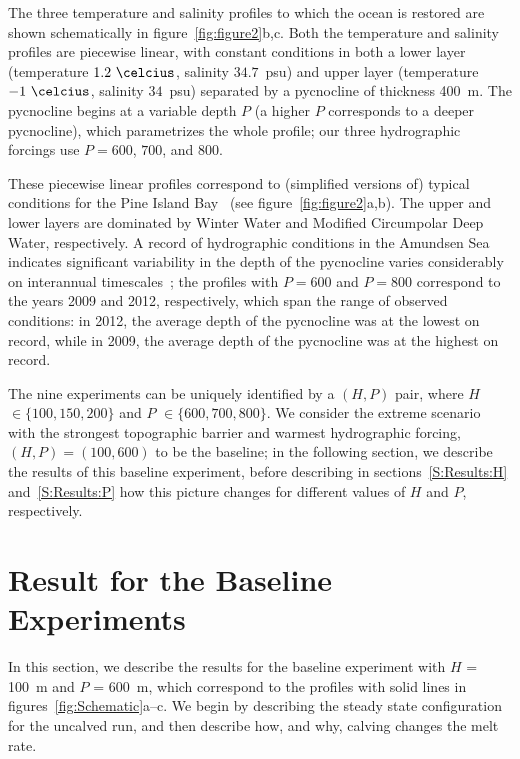 \documentclass[draft]{agujournal2019}
\begin{document}
The three temperature and salinity profiles to which the ocean is restored are shown schematically in figure~\ref{fig:figure2}b,c. Both the temperature and salinity profiles are piecewise linear, with constant conditions in both a lower layer (temperature $1.2~\si{\celcius}$, salinity $34.7$~psu) and upper layer (temperature $-1~\si{\celcius}$, salinity $34$~psu) separated by a pycnocline of thickness 400~m. The pycnocline begins at a variable depth $P$ (a higher $P$ corresponds to a deeper pycnocline), which parametrizes the whole profile; our three hydrographic forcings use $P = 600$, $700$, and $800$. 

These piecewise linear profiles correspond to (simplified versions of) typical conditions for the Pine Island Bay~\cite{Jacobs1996GRL, Dutrieux2014Science, Jenkins2018NatureGeo} (see figure~\ref{fig:figure2}a,b). The upper and lower layers are dominated by Winter Water and Modified Circumpolar Deep Water, respectively. A record of hydrographic conditions in the Amundsen Sea indicates significant variability in the depth of the pycnocline varies considerably on interannual timescales~\cite{Dutrieux2014Science}; the profiles with $P = 600$ and $P = 800$ correspond to the years 2009 and 2012, respectively, which span the range of observed conditions: in 2012, the average depth of the pycnocline was at the lowest on record, while in 2009, the average depth of the pycnocline was at the highest on record. 

The nine experiments can be uniquely identified by a $(H,P)$ pair, where $H$ $\in \{100, 150, 200\}$ and $P$ $\in \{600, 700, 800\}$. We consider the extreme scenario with the strongest topographic barrier and warmest hydrographic forcing, $(H,P) = (100,600)$ to be the baseline; in the following section, we describe the results of this baseline experiment, before describing in sections~\ref{S:Results:H} and~\ref{S:Results:P} how this picture changes for different values of $H$ and $P$, respectively.

\section{Result for the Baseline Experiments}\label{S:Baseline}
In this section, we describe the results for the baseline experiment with $H$ = 100~m and $P$ = 600~m, which correspond to the profiles with solid lines in figures~\ref{fig:Schematic}a--c. We begin by describing the steady state configuration for the uncalved run, and then describe how, and why, calving changes the melt rate.
\end{document}
